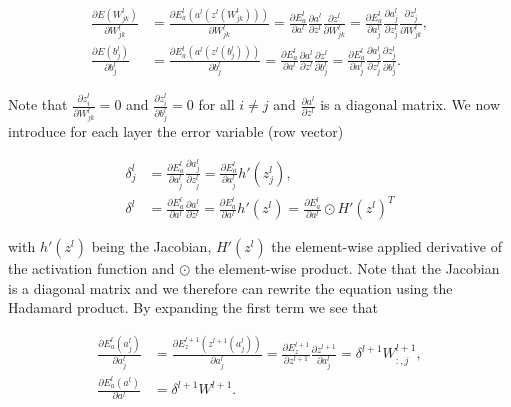\documentclass[english,11pt,a4paper]{article}
\begin{document}
\begin{equation}
	\begin{aligned}
		\frac{\partial E(W_{jk}^l)}{\partial W_{jk}^l} &= 
		\frac{\partial E^l_a(a^l(z^l(W_{jk}^l)))}{\partial W_{jk}^l} =
		\frac{\partial E^l_a}{\partial a^l} \frac{\partial a^l}{\partial z^l} \frac{\partial z^l}{\partial W^l_{jk}} =
		\frac{\partial E^l_a}{\partial a^l_j} \frac{\partial a^l_j}{\partial z^l_j} \frac{\partial z^l_j}{\partial W^l_{jk}}, \\
		\frac{\partial E(b_j^l)}{\partial b_j^l} &=
		\frac{\partial E^l_a(a^l(z^l(b_j^l)))}{\partial b_j^l} =
		\frac{\partial E^l_a}{\partial a^l} \frac{\partial a^l}{\partial z^l} \frac{\partial z^l}{\partial b_j^l} =
		\frac{\partial E^l_a}{\partial a^l_j} \frac{\partial a^l_j}{\partial z^l_j} \frac{\partial z^l_j}{\partial b_j^l}.
	\end{aligned}
	\label{eq:backprop_chainrule}
\end{equation}

Note that $\frac{\partial z^l_i}{\partial W^l_{jk}} = 0$ and $\frac{\partial z^l_i}{\partial b_j^l} = 0$ for all $i \neq j$ and $\frac{\partial a^l}{\partial z^l}$ is a diagonal matrix. We now introduce for each layer the error variable (row vector)

\begin{equation}
	\begin{aligned}
		\delta^l_j &= \frac{\partial E^l_a}{\partial a^l_j} \frac{\partial a^l_j}{\partial z^l_j} =
		\frac{\partial E^l_a}{\partial a^l_j} h'(z^l_j), \\
		\delta^l &= \frac{\partial E^l_a}{\partial a^l} \frac{\partial a^l}{\partial z^l} =
		\frac{\partial E^l_a}{\partial a^l} h'(z^l) = \frac{\partial E^l_a}{\partial a^l} \odot H'(z^l)^T
	\end{aligned}
\end{equation}

with $h'(z^l)$ being the Jacobian, $H'(z^l)$ the element-wise applied derivative of the activation function and $\odot$ the element-wise product. Note that the Jacobian is a diagonal matrix and we therefore can rewrite the equation using the Hadamard product. By expanding the first term we see that

\begin{equation}
	\begin{aligned}
		\frac{\partial E^l_a(a^l_j)}{\partial a^l_j} &= 
		\frac{\partial E^{l+1}_z(z^{l+1}(a^l_j))}{\partial a^l_j} = 
		\frac{\partial E^{l+1}_z}{\partial z^{l+1}} \frac{\partial z^{l+1}}{\partial a^l_j} = 
		\delta^{l+1}W^{l+1}_{:,j}, \\
		\frac{\partial E^l_a(a^l)}{\partial a^l} &= \delta^{l+1}W^{l+1}.
	\end{aligned}
\end{equation}
\end{document}
